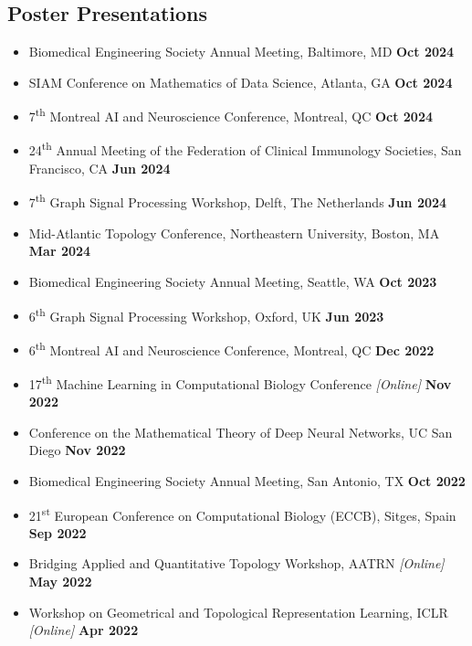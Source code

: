 \documentclass[margin,line]{res}
\begin{document}
\begin{resume}
\section{\sc Poster Presentations}
{\renewcommand\leftmargini{0em}
\begin{itemize}
\setlength\itemsep{0.3em}
\item[] Biomedical Engineering Society Annual Meeting, Baltimore, MD \hfill {\bf \small Oct 2024}
\item[] SIAM Conference on Mathematics of Data Science, Atlanta, GA \hfill {\bf \small Oct 2024}
\item[] 7\textsuperscript{th} Montreal AI and Neuroscience Conference, Montreal, QC \hfill {\bf \small Oct 2024}
\item[] {\small 24\textsuperscript{th} Annual Meeting of the Federation of Clinical Immunology Societies, San Francisco, CA} \hfill {\bf \small Jun 2024}
\item[] 7\textsuperscript{th} Graph Signal Processing Workshop, Delft, The Netherlands \hfill {\bf \small Jun 2024}
\item[] Mid-Atlantic Topology Conference, Northeastern University, Boston, MA \hfill {\bf \small Mar 2024}
\item[] Biomedical Engineering Society Annual Meeting, Seattle, WA \hfill {\bf \small  Oct 2023}
\item[] 6\textsuperscript{th} Graph Signal Processing Workshop, Oxford, UK \hfill {\bf \small  Jun 2023}
\item[] 6\textsuperscript{th} Montreal AI and Neuroscience Conference, Montreal, QC \hfill {\bf \small  Dec 2022}
\item[] 17\textsuperscript{th} Machine Learning in Computational Biology Conference \textit{[Online]} \hfill {\bf \small  Nov 2022}
\item[] Conference on the Mathematical Theory of Deep Neural Networks, UC San Diego \hfill {\bf \small  Nov 2022}
\item[] Biomedical Engineering Society Annual Meeting, San Antonio, TX \hfill {\bf \small  Oct 2022}
\item[] 21\textsuperscript{st} European Conference on Computational Biology (ECCB), Sitges, Spain \hfill {\bf \small  Sep 2022}
\item[] Bridging Applied and Quantitative Topology Workshop, AATRN \textit{[Online]} \hfill {\bf \small  May 2022}
\item[] Workshop on Geometrical and Topological Representation Learning, ICLR \textit{[Online]} \hfill {\bf \small  Apr 2022} 

\end{itemize}}
\end{resume}
\end{document}
